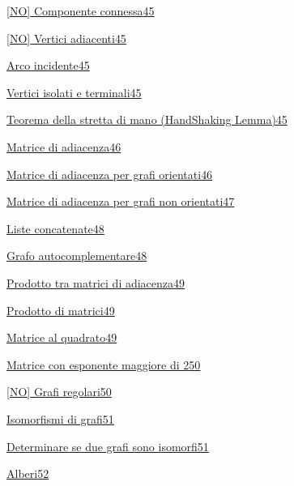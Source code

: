 \documentclass{article}
\begin{document}
{\protect\hyperlink{h.iejp6ankfctp}{{[}NO{]} Componente connessa}}{\protect\hyperlink{h.iejp6ankfctp}{45}}

{\protect\hyperlink{h.5nknzat57p06}{{[}NO{]} Vertici adiacenti}}{\protect\hyperlink{h.5nknzat57p06}{45}}

{\protect\hyperlink{h.52hqmabofvh0}{Arco incidente}}{\protect\hyperlink{h.52hqmabofvh0}{45}}

{\protect\hyperlink{h.vm6z084zc6rf}{Vertici isolati e terminali}}{\protect\hyperlink{h.vm6z084zc6rf}{45}}

{\protect\hyperlink{h.d1yeo9bkhutt}{Teorema della stretta di mano (HandShaking Lemma)}}{\protect\hyperlink{h.d1yeo9bkhutt}{45}}

{\protect\hyperlink{h.viqjw1dxzez8}{Matrice di adiacenza}}{\protect\hyperlink{h.viqjw1dxzez8}{46}}

{\protect\hyperlink{h.30h8k4akc7l}{Matrice di adiacenza per grafi orientati}}{\protect\hyperlink{h.30h8k4akc7l}{46}}

{\protect\hyperlink{h.iuwxcos21awu}{Matrice di adiacenza per grafi non orientati}}{\protect\hyperlink{h.iuwxcos21awu}{47}}

{\protect\hyperlink{h.qwq1tiruc9xg}{Liste concatenate}}{\protect\hyperlink{h.qwq1tiruc9xg}{48}}

{\protect\hyperlink{h.tsrwv4qy0dku}{Grafo autocomplementare}}{\protect\hyperlink{h.tsrwv4qy0dku}{48}}

{\protect\hyperlink{h.akx1r9fzvwzo}{Prodotto tra matrici di adiacenza}}{\protect\hyperlink{h.akx1r9fzvwzo}{49}}

{\protect\hyperlink{h.c39ti8il3qtf}{Prodotto di matrici}}{\protect\hyperlink{h.c39ti8il3qtf}{49}}

{\protect\hyperlink{h.md5vuljp7xm}{Matrice al quadrato}}{\protect\hyperlink{h.md5vuljp7xm}{49}}

{\protect\hyperlink{h.yvqsj238z2mk}{Matrice con esponente maggiore di 2}}{\protect\hyperlink{h.yvqsj238z2mk}{50}}

{\protect\hyperlink{h.m8b6lpkoqj6x}{{[}NO{]} Grafi regolari}}{\protect\hyperlink{h.m8b6lpkoqj6x}{50}}

{\protect\hyperlink{h.d5v408sc7po0}{Isomorfismi di grafi}}{\protect\hyperlink{h.d5v408sc7po0}{51}}

{\protect\hyperlink{h.umjijdswjd6a}{Determinare se due grafi sono isomorfi}}{\protect\hyperlink{h.umjijdswjd6a}{51}}

{\protect\hyperlink{h.jnoiha3cadu8}{Alberi}}{\protect\hyperlink{h.jnoiha3cadu8}{52}}
\end{document}
